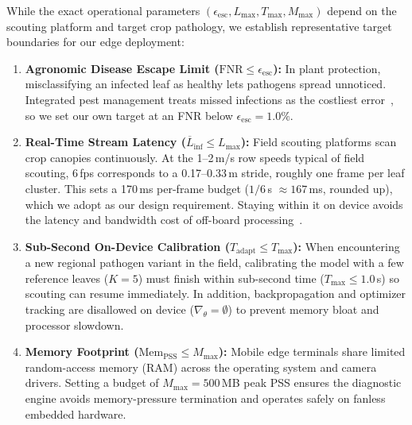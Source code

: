 \documentclass[preprint,12pt]{elsarticle}
\begin{document}
While the exact operational parameters $(\epsilon_{\text{esc}}, L_{\max}, T_{\max}, M_{\max})$ depend on the scouting platform and target crop pathology, we establish representative target boundaries for our edge deployment:
\begin{enumerate}
    \item \textbf{Agronomic Disease Escape Limit ($\text{FNR} \le \epsilon_{\text{esc}}$):} In plant protection, misclassifying an infected leaf as healthy lets pathogens spread unnoticed. Integrated pest management treats missed infections as the costliest error~\cite{richard2022control}, so we set our own target at an FNR below $\epsilon_{\text{esc}} = 1.0\%$.
    \item \textbf{Real-Time Stream Latency ($\overline{L}_{\text{inf}} \le L_{\max}$):} Field scouting platforms scan crop canopies continuously. At the 1--2\,m/s row speeds typical of field scouting, 6\,fps corresponds to a 0.17--0.33\,m stride, roughly one frame per leaf cluster. This sets a 170\,ms per-frame budget ($1/6$\,s $\approx 167$\,ms, rounded up), which we adopt as our design requirement. Staying within it on device avoids the latency and bandwidth cost of off-board processing~\cite{radocaj2025evolution}.
    \item \textbf{Sub-Second On-Device Calibration ($T_{\text{adapt}} \le T_{\max}$):} When encountering a new regional pathogen variant in the field, calibrating the model with a few reference leaves ($K=5$) must finish within sub-second time ($T_{\max} \le 1.0$\,s) so scouting can resume immediately. In addition, backpropagation and optimizer tracking are disallowed on device ($\nabla_\theta = \emptyset$) to prevent memory bloat and processor slowdown.
    \item \textbf{Memory Footprint ($\text{Mem}_{\text{PSS}} \le M_{\max}$):} Mobile edge terminals share limited random-access memory (RAM) across the operating system and camera drivers. Setting a budget of $M_{\max} = 500$\,MB peak PSS ensures the diagnostic engine avoids memory-pressure termination and operates safely on fanless embedded hardware.
\end{enumerate}
\end{document}
